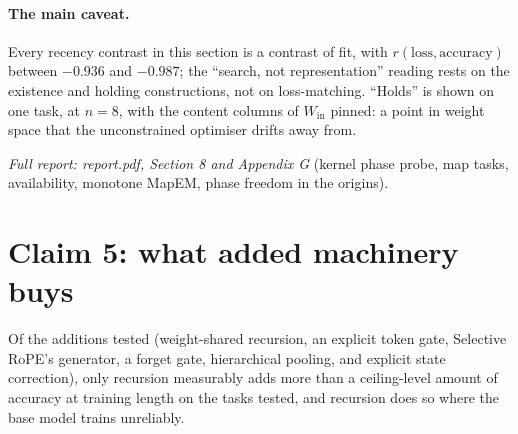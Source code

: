 \documentclass[10pt]{article}
\begin{document}
\paragraph{The main caveat.} Every recency contrast in this section is a contrast of fit, with
$r(\text{loss},\text{accuracy})$ between $-0.936$ and $-0.987$; the ``search, not representation'' reading rests on
the existence and holding constructions, not on loss-matching. ``Holds'' is shown on one task, at $n=8$, with the
content columns of $W_{\mathrm{in}}$ pinned: a point in weight space that the unconstrained optimiser drifts away
from.

\noindent\emph{Full report: report.pdf, Section 8 and Appendix G} (kernel phase probe, map tasks, availability,
monotone MapEM, phase freedom in the origins).

\section{Claim 5: what added machinery buys}
\label{sec:claim5}

Of the additions tested (weight-shared recursion, an explicit token gate, Selective RoPE's generator, a forget gate,
hierarchical pooling, and explicit state correction), only recursion measurably adds more than a ceiling-level
amount of accuracy at training length on the tasks tested, and recursion does so where the base model trains
unreliably.
\end{document}
